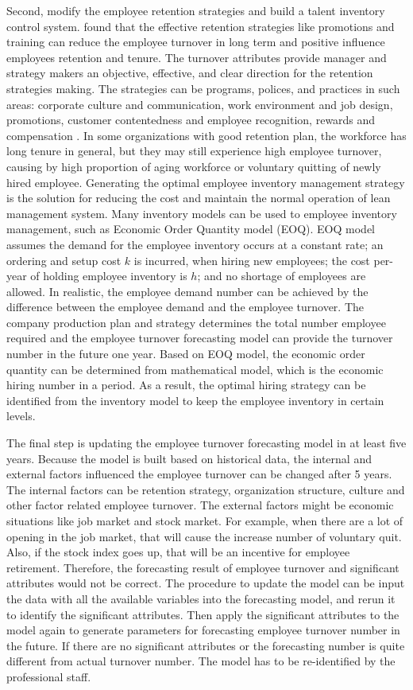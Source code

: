 Second, modify the employee retention strategies and build a talent inventory control system. \citet{moncarz2009} found that the effective retention strategies like promotions and training can reduce the employee turnover in long term and positive influence employees retention and tenure. The turnover attributes provide manager and strategy makers an objective, effective, and clear direction for the retention strategies making. The strategies can be programs, polices, and practices in such areas: corporate culture and communication, work environment and job design, promotions, customer contentedness and employee recognition, rewards and compensation \citep{moncarz2009}. In some organizations with good retention plan, the workforce has long tenure in general, but they may still experience high employee turnover, causing by high proportion of aging workforce or voluntary quitting of newly hired employee. Generating the optimal employee inventory management strategy is the solution for reducing the cost and maintain the normal operation of lean management system. Many inventory models can be used to employee inventory management, such as Economic Order Quantity model (EOQ). EOQ model assumes the demand for the employee inventory occurs at a constant rate; an ordering and setup cost $k$ is incurred, when hiring new employees; the cost per-year of holding employee inventory is $h$; and no shortage of employees are allowed. In realistic, the employee demand number can be achieved by the difference between the employee demand and the employee turnover. The company production plan and strategy determines the total number employee required and the employee turnover forecasting model can provide the turnover number in the future one year. Based on EOQ model, the economic order quantity can be determined from mathematical model, which is the economic hiring number in a period. As a result, the optimal hiring strategy can be identified from the inventory model to keep the employee inventory in certain levels. 

The final step is updating the employee turnover forecasting model in at least five years. Because the model is built based on historical data, the internal and external factors influenced the employee turnover can be changed after 5 years. The internal factors can be retention strategy, organization structure, culture and other factor related employee turnover. The external factors might be economic situations like job market and stock market. For example, when there are a lot of opening in the job market, that will cause the increase number of voluntary quit. Also,  if the stock index goes up, that will be an incentive for employee retirement. Therefore, the forecasting result of employee turnover and significant attributes would not be correct. The procedure to update the model can be input the data with all the available variables into the forecasting model, and rerun it to identify the significant attributes. Then apply the significant attributes to the model again to generate parameters for forecasting employee turnover number in the future. If there are no significant attributes or the forecasting number is quite different from actual turnover number. The model has to be re-identified by the professional staff.  

